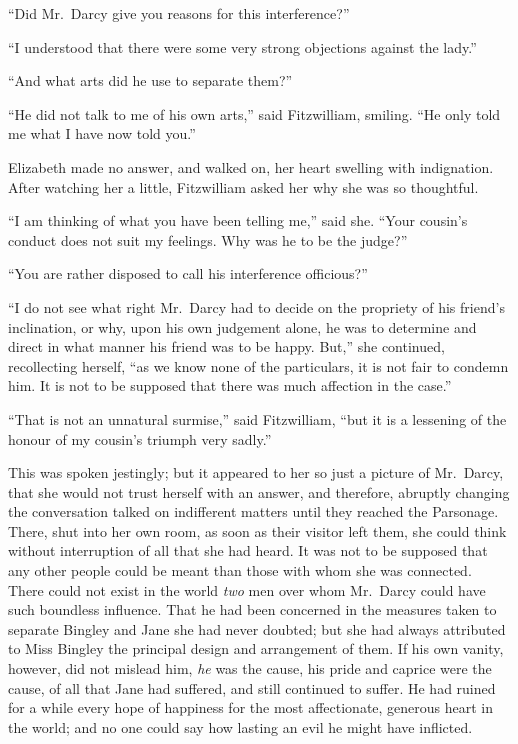 ``Did Mr.\ Darcy give you reasons for this interference?''

``I understood that there were some very strong objections
against the lady.''

``And what arts did he use to separate them?''

``He did not talk to me of his own arts,'' said Fitzwilliam, smiling.
``He only told me what I have now told you.''

Elizabeth made no answer, and walked on, her heart swelling
with indignation.  After watching her a little, Fitzwilliam asked
her why she was so thoughtful.

``I am thinking of what you have been telling me,'' said she.
``Your cousin's conduct does not suit my feelings.  Why was he
to be the judge?''

``You are rather disposed to call his interference officious?''

``I do not see what right Mr.\ Darcy had to decide on the
propriety of his friend's inclination, or why, upon his own
judgement alone, he was to determine and direct in what manner
his friend was to be happy.  But,'' she continued, recollecting
herself, ``as we know none of the particulars, it is not fair to
condemn him.  It is not to be supposed that there was much
affection in the case.''

``That is not an unnatural surmise,'' said Fitzwilliam, ``but it is a
lessening of the honour of my cousin's triumph very sadly.''

This was spoken jestingly; but it appeared to her so just a picture
of Mr.\ Darcy, that she would not trust herself with an answer,
and therefore, abruptly changing the conversation talked on
indifferent matters until they reached the Parsonage.  There, shut
into her own room, as soon as their visitor left them, she could
think without interruption of all that she had heard.  It was not
to be supposed that any other people could be meant than those
with whom she was connected.  There could not exist in the
world \emph{two} men over whom Mr.\ Darcy could have such boundless
influence.  That he had been concerned in the measures taken to
separate Bingley and Jane she had never doubted; but she had
always attributed to Miss Bingley the principal design and
arrangement of them.  If his own vanity, however, did not mislead
him, \emph{he} was the cause, his pride and caprice were the cause, of
all that Jane had suffered, and still continued to suffer.  He
had ruined for a while every hope of happiness for the most
affectionate, generous heart in the world; and no one could say
how lasting an evil he might have inflicted.


